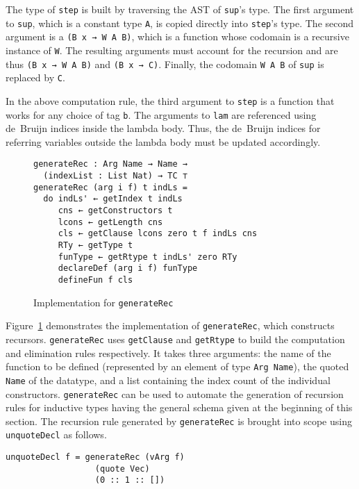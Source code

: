 \documentclass[sigplan,10pt]{acmart}
\begin{document}
The type of {\tt step} is built by traversing the AST of {\tt sup}'s type.
The first argument to {\tt sup}, which is a constant type {\tt A}, is copied directly into \texttt{step}'s type.
The second argument is a {\tt (B x → W A B)}, which is a function whose codomain is a recursive instance of {\tt W}.
The resulting arguments must account for the recursion and are thus {\tt (B x → W A B)} and \texttt{(B x → C)}.
Finally, the codomain {\tt W A B} of {\tt sup} is replaced by {\tt C}.

In the above computation rule, the third argument to {\tt step} is a function that works for any choice of tag \texttt{b}.
The arguments to {\tt lam} are referenced using de~Bruijn indices inside the lambda body.
Thus, the de~Bruijn indices for referring variables outside the lambda body must be updated accordingly.



\begin{figure}
\begin{center}
\begin{Verbatim}
generateRec : Arg Name → Name → 
  (indexList : List Nat) → TC ⊤
generateRec (arg i f) t indLs =
  do indLs' ← getIndex t indLs
     cns ← getConstructors t
     lcons ← getLength cns
     cls ← getClause lcons zero t f indLs cns
     RTy ← getType t
     funType ← getRtype t indLs' zero RTy
     declareDef (arg i f) funType
     defineFun f cls
\end{Verbatim}
\end{center}
\caption{Implementation for {\tt generateRec}}
\label{fig:generateRec}
\end{figure}

Figure~\ref{fig:generateRec} demonstrates the implementation of {\tt generateRec}, which constructs recursors.
{\tt generateRec} uses {\tt getClause} and {\tt getRtype} to build the computation and elimination rules respectively. It takes three arguments: the name of the function to be defined (represented by an element of type {\tt Arg Name}), the quoted {\tt Name} of the datatype, and a list containing the index count
of the individual constructors. {\tt generateRec} can be used to automate the generation of recursion rules for inductive types having the general schema given at the beginning of this section. The recursion rule generated by {\tt generateRec} is brought into scope using {\tt unquoteDecl} as follows.

\begin{center}
\begin{BVerbatim}
unquoteDecl f = generateRec (vArg f)
                  (quote Vec) 
                  (0 :: 1 :: [])
\end{BVerbatim}
\end{center}
\end{document}

